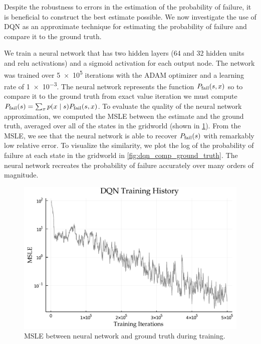 Despite the robustness to errors in the estimation of the probability of failure, it is beneficial to construct the best estimate possible. We now investigate the use of DQN as an approximate technique for estimating the probability of failure and compare it to the ground truth. 

We train a neural network that has two hidden layers (\num{64} and \num{32} hidden units and relu activations) and a sigmoid activation for each output node. The network was trained over \num{5e5} iterations with the ADAM optimizer and a learning rate of \num{1e-3}. The neural network represents the function $P_{\rm fail}(s,x)$ so to compare it to the ground truth from exact value iteration we must compute $P_{\rm fail}(s) = \sum_x p(x \mid s)P_{\rm fail}(s,x)$. To evaluate the quality of the neural network approximation, we computed the MSLE between the estimate and the ground truth, averaged over all of the states in the gridworld (shown in \cref{fig:gridworld_pfail_dqn_training_hist}). From the MSLE, we see that the neural network is able to recover $P_{\rm fail}(s)$ with remarkably low relative error. To visualize the similarity, we plot the log of the probability of failure at each state in the gridworld in \cref{fig:dqn_comp_ground_truth}. The neural network recreates the probability of failure accurately over many orders of magnitude. 

\begin{figure}
        \centering
        \includegraphics[width=\textwidth]{figures/distribution_over_failures/dqn_training_history.pdf}
        \caption{MSLE between neural network and ground truth during training.}
        \label{fig:gridworld_pfail_dqn_training_hist}
\end{figure}

